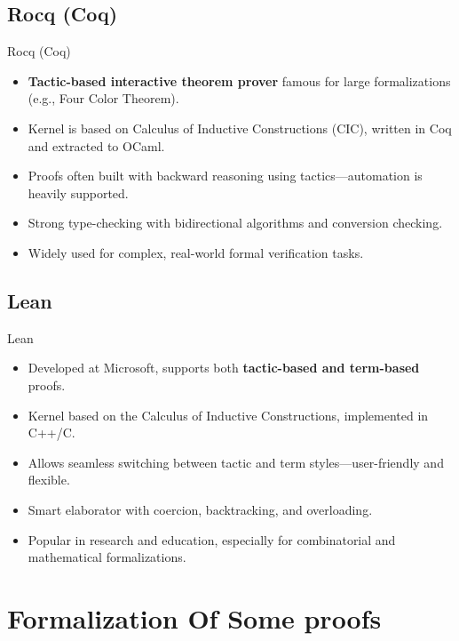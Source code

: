 \documentclass[aspectratio=169, compress, 12pt]{beamer}
\begin{document}
\subsection*{Rocq (Coq)}
\begin{frame}{Rocq (Coq)}
\begin{itemize}
    \item \textbf{Tactic-based interactive theorem prover} famous for large formalizations (e.g., Four Color Theorem).
    \item Kernel is based on Calculus of Inductive Constructions (CIC), written in Coq and extracted to OCaml.
    \item Proofs often built with backward reasoning using tactics---automation is heavily supported.
    \item Strong type-checking with bidirectional algorithms and conversion checking.
    \item Widely used for complex, real-world formal verification tasks.
\end{itemize}
\end{frame}
\subsection*{Lean}
\begin{frame}{Lean}
\begin{itemize}
    \item Developed at Microsoft, supports both \textbf{tactic-based and term-based} proofs.
    \item Kernel based on the Calculus of Inductive Constructions, implemented in C++/C.
    \item Allows seamless switching between tactic and term styles---user-friendly and flexible.
    \item Smart elaborator with coercion, backtracking, and overloading.
    \item Popular in research and education, especially for combinatorial and mathematical formalizations.
\end{itemize}
\end{frame}
\section{Formalization Of Some proofs}


  
\end{document}
